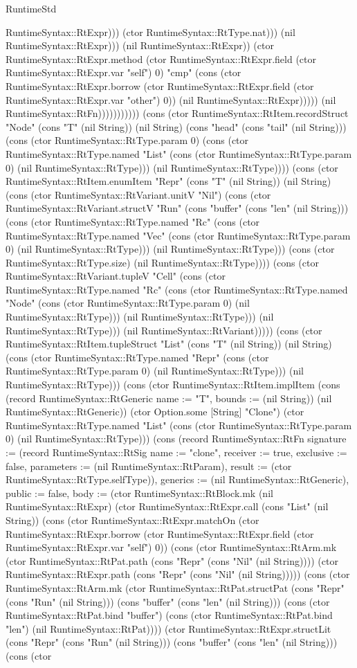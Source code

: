 \begin{lexlean}{RuntimeStd}
\begin{semanticmodule}
{RuntimeSyntax::RtExpr))) (ctor RuntimeSyntax::RtType.nat))) (nil RuntimeSyntax::RtExpr))) (nil RuntimeSyntax::RtExpr)) (ctor RuntimeSyntax::RtExpr.method (ctor RuntimeSyntax::RtExpr.field (ctor RuntimeSyntax::RtExpr.var "self") 0) "cmp" (cons (ctor RuntimeSyntax::RtExpr.borrow (ctor RuntimeSyntax::RtExpr.field (ctor RuntimeSyntax::RtExpr.var "other") 0)) (nil RuntimeSyntax::RtExpr))))}) (nil RuntimeSyntax::RtFn))))))))))) (cons (ctor RuntimeSyntax::RtItem.recordStruct "Node" (cons "T" (nil String)) (nil String) (cons "head" (cons "tail" (nil String))) (cons (ctor RuntimeSyntax::RtType.param 0) (cons (ctor RuntimeSyntax::RtType.named "List" (cons (ctor RuntimeSyntax::RtType.param 0) (nil RuntimeSyntax::RtType))) (nil RuntimeSyntax::RtType)))) (cons (ctor RuntimeSyntax::RtItem.enumItem "Repr" (cons "T" (nil String)) (nil String) (cons (ctor RuntimeSyntax::RtVariant.unitV "Nil") (cons (ctor RuntimeSyntax::RtVariant.structV "Run" (cons "buffer" (cons "len" (nil String))) (cons (ctor RuntimeSyntax::RtType.named "Rc" (cons (ctor RuntimeSyntax::RtType.named "Vec" (cons (ctor RuntimeSyntax::RtType.param 0) (nil RuntimeSyntax::RtType))) (nil RuntimeSyntax::RtType))) (cons (ctor RuntimeSyntax::RtType.size) (nil RuntimeSyntax::RtType)))) (cons (ctor RuntimeSyntax::RtVariant.tupleV "Cell" (cons (ctor RuntimeSyntax::RtType.named "Rc" (cons (ctor RuntimeSyntax::RtType.named "Node" (cons (ctor RuntimeSyntax::RtType.param 0) (nil RuntimeSyntax::RtType))) (nil RuntimeSyntax::RtType))) (nil RuntimeSyntax::RtType))) (nil RuntimeSyntax::RtVariant))))) (cons (ctor RuntimeSyntax::RtItem.tupleStruct "List" (cons "T" (nil String)) (nil String) (cons (ctor RuntimeSyntax::RtType.named "Repr" (cons (ctor RuntimeSyntax::RtType.param 0) (nil RuntimeSyntax::RtType))) (nil RuntimeSyntax::RtType))) (cons (ctor RuntimeSyntax::RtItem.implItem (cons (record RuntimeSyntax::RtGeneric {name := "T", bounds := (nil String)}) (nil RuntimeSyntax::RtGeneric)) (ctor Option.some [String] "Clone") (ctor RuntimeSyntax::RtType.named "List" (cons (ctor RuntimeSyntax::RtType.param 0) (nil RuntimeSyntax::RtType))) (cons (record RuntimeSyntax::RtFn {signature := (record RuntimeSyntax::RtSig {name := "clone", receiver := true, exclusive := false, parameters := (nil RuntimeSyntax::RtParam), result := (ctor RuntimeSyntax::RtType.selfType)}), generics := (nil RuntimeSyntax::RtGeneric), public := false, body := (ctor RuntimeSyntax::RtBlock.mk (nil RuntimeSyntax::RtExpr) (ctor RuntimeSyntax::RtExpr.call (cons "List" (nil String)) (cons (ctor RuntimeSyntax::RtExpr.matchOn (ctor RuntimeSyntax::RtExpr.borrow (ctor RuntimeSyntax::RtExpr.field (ctor RuntimeSyntax::RtExpr.var "self") 0)) (cons (ctor RuntimeSyntax::RtArm.mk (ctor RuntimeSyntax::RtPat.path (cons "Repr" (cons "Nil" (nil String)))) (ctor RuntimeSyntax::RtExpr.path (cons "Repr" (cons "Nil" (nil String))))) (cons (ctor RuntimeSyntax::RtArm.mk (ctor RuntimeSyntax::RtPat.structPat (cons "Repr" (cons "Run" (nil String))) (cons "buffer" (cons "len" (nil String))) (cons (ctor RuntimeSyntax::RtPat.bind "buffer") (cons (ctor RuntimeSyntax::RtPat.bind "len") (nil RuntimeSyntax::RtPat)))) (ctor RuntimeSyntax::RtExpr.structLit (cons "Repr" (cons "Run" (nil String))) (cons "buffer" (cons "len" (nil String))) (cons (ctor }
\end{semanticmodule}
\end{lexlean}
